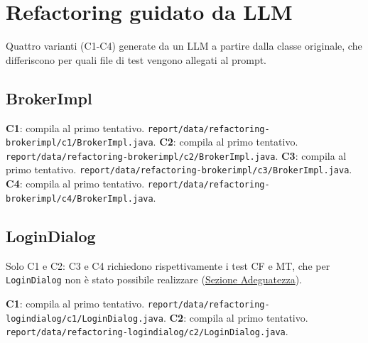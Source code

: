 \section{Refactoring guidato da LLM}
\label{sec:refactoring}

Quattro varianti (C1-C4) generate da un LLM a partire dalla classe originale, che differiscono
per quali file di test vengono allegati al prompt.
\subsection{BrokerImpl}

\textbf{C1}: compila al primo tentativo.
\texttt{report/data/refactoring-brokerimpl/c1/BrokerImpl.java}.
\textbf{C2}: compila al primo tentativo.
\texttt{report/data/refactoring-brokerimpl/c2/BrokerImpl.java}.
\textbf{C3}: compila al primo tentativo.
\texttt{report/data/refactoring-brokerimpl/c3/BrokerImpl.java}.
\textbf{C4}: compila al primo tentativo.
\texttt{report/data/refactoring-brokerimpl/c4/BrokerImpl.java}.

\subsection{LoginDialog}

Solo C1 e C2: C3 e C4 richiedono rispettivamente i test CF e MT, che per \texttt{LoginDialog}
non è stato possibile realizzare (\hyperref[sec:adeguatezza]{Sezione Adeguatezza}).

\textbf{C1}: compila al primo tentativo.
\texttt{report/data/refactoring-logindialog/c1/LoginDialog.java}.
\textbf{C2}: compila al primo tentativo.
\texttt{report/data/refactoring-logindialog/c2/LoginDialog.java}.
